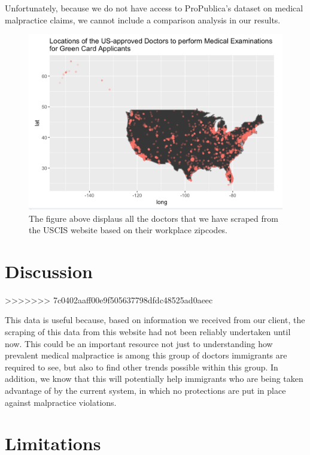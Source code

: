 \documentclass[10pt,letterpaper]{article}
\begin{document}
Unfortunately, because we do not have access to ProPublica's dataset on
medical malpractice claims, we cannot include a comparison analysis in
our results.

\begin{figure}
\includegraphics[width=1\linewidth]{ResultsMap} \caption{The figure above displaus all the doctors that we have scraped from the USCIS website based on their workplace zipcodes.}\label{fig:unnamed-chunk-5}
\end{figure}

\section{Discussion}\label{discussion}
>>>>>>> 7c0402aaff00e9f505637798dfdc48525ad0aeec

This data is useful because, based on information we received from our
client, the scraping of this data from this website had not been
reliably undertaken until now. This could be an important resource not
just to understanding how prevalent medical malpractice is among this
group of doctors immigrants are required to see, but also to find other
trends possible within this group. In addition, we know that this will
potentially help immigrants who are being taken advantage of by the
current system, in which no protections are put in place against
malpractice violations.

\hypertarget{limitations}{%
\section{Limitations}\label{limitations}}
\end{document}
